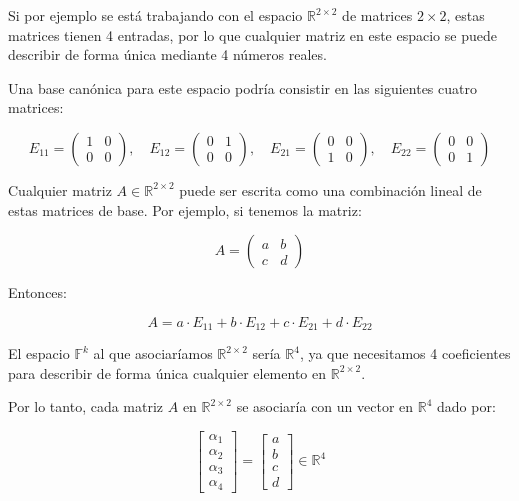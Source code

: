Si por ejemplo se está trabajando con el espacio \( \mathbb{R}^{2 \times 2} \) de matrices \( 2 \times 2 \), estas matrices tienen 4 entradas, por lo que cualquier matriz en este espacio se puede describir de forma única mediante 4 números reales.

Una base canónica para este espacio podría consistir en las siguientes cuatro matrices:

\[
E_{11} = \begin{pmatrix}
1 & 0 \\
0 & 0
\end{pmatrix}, \quad
E_{12} = \begin{pmatrix}
0 & 1 \\
0 & 0
\end{pmatrix}, \quad
E_{21} = \begin{pmatrix}
0 & 0 \\
1 & 0
\end{pmatrix}, \quad
E_{22} = \begin{pmatrix}
0 & 0 \\
0 & 1
\end{pmatrix}
\]

Cualquier matriz   \(A \in \mathbb{R}^{2 \times 2} \) puede ser escrita como una combinación lineal de estas matrices de base. Por ejemplo, si tenemos la matriz:

\[
A = \begin{pmatrix}
a & b \\
c & d
\end{pmatrix}
\]

Entonces:

\[
A = a \cdot E_{11} + b \cdot E_{12} + c \cdot E_{21} + d \cdot E_{22}
\]

El espacio \( \mathbb{F}^k \) al que asociaríamos \( \mathbb{R}^{2 \times 2} \) sería \( \mathbb{R}^4 \), ya que necesitamos 4 coeficientes para describir de forma única cualquier elemento en \( \mathbb{R}^{2 \times 2} \).

Por lo tanto, cada matriz \( A \) en \( \mathbb{R}^{2 \times 2} \) se asociaría con un vector en \( \mathbb{R}^4 \) dado por:

\[
\left[\begin{array}{c}
    \alpha_1 \\
    \alpha_2 \\
    \alpha_3 \\
    \alpha_4
\end{array}  \right] = \left[\begin{array}{c}
    a \\
    b \\
    c \\
    d
\end{array}  \right] \in \mathbb{R}^4
\]

